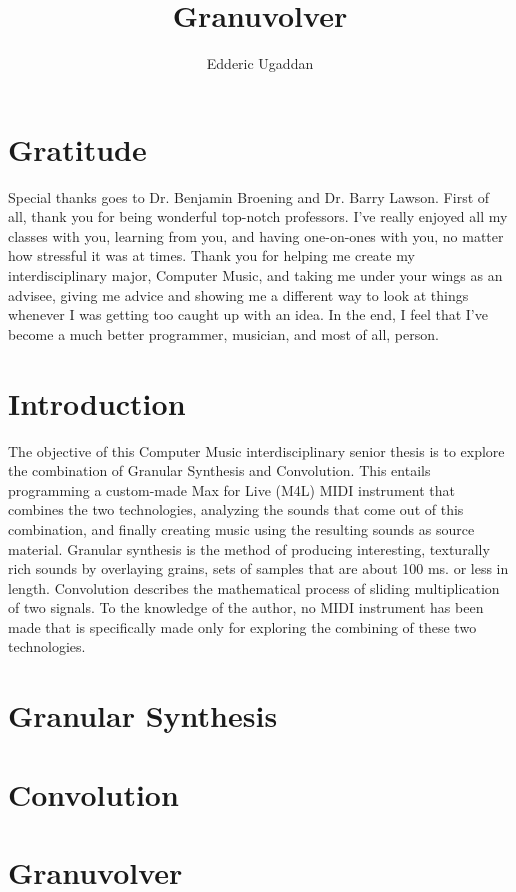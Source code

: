 \documentclass{article}
\author{Edderic Ugaddan}
\title{Granuvolver}
\begin{document}
	\maketitle
	\tableofcontents
	\section{Gratitude}
	Special thanks goes to Dr. Benjamin Broening and Dr. Barry Lawson. First of all, thank you for being wonderful top-notch professors. I've really enjoyed all my classes with you, learning from you, and having one-on-ones with you, no matter how stressful it was at times. Thank you for helping me create my interdisciplinary major, Computer Music, and taking me under your wings as an advisee, giving me advice and showing me a different way to look at things whenever I was getting too caught up with an idea.  In the end, I feel that I've become a much better programmer, musician, and most of all, person.

	\section{Introduction}

	The objective of this Computer Music interdisciplinary senior thesis is to explore the combination of Granular Synthesis and Convolution. This entails programming a custom-made Max for Live (M4L) MIDI instrument that combines the two technologies, analyzing the sounds that come out of this combination, and finally creating music using the resulting sounds as source material. Granular synthesis is the method of producing interesting, texturally rich sounds by overlaying grains, sets of samples that are about 100 ms. or less in length. Convolution describes the mathematical process of sliding multiplication of two signals.   To the knowledge of the author, no MIDI instrument has been made that is specifically made only for exploring the combining of these two technologies.


	\section{Granular Synthesis}
	\section{Convolution}
	\section{Granuvolver}
\end{document}
